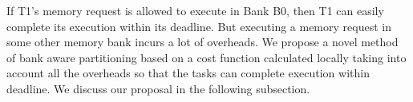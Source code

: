 If T1's memory request is allowed to execute in Bank B0, then T1 can easily complete its execution within its deadline.
But executing a memory request in some other memory bank incurs a lot of overheads. We propose a novel method of bank aware 
partitioning based on a cost function calculated locally taking into account all the overheads so that the tasks can complete 
execution within deadline. We discuss our proposal in the following subsection.

\begin{table}[t]
\caption{Task Specifications}
\begin{center}
 \end{center}
\label{tab1}
\end{table}

